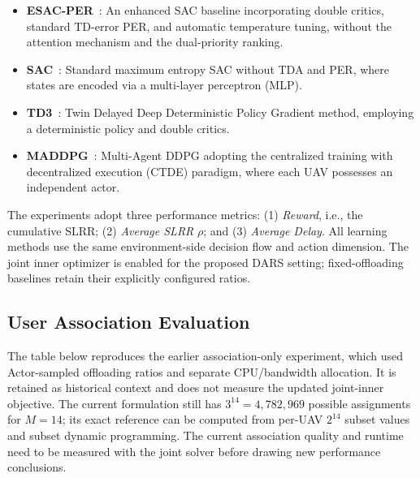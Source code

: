 \documentclass[journal]{IEEEtran}
\begin{document}
\begin{itemize}
\item \textbf{ESAC-PER}~\cite{nabi2025jour}: An enhanced SAC baseline incorporating double critics,
standard TD-error PER, and automatic temperature tuning, without the attention
mechanism and the dual-priority ranking.

\item \textbf{SAC}~\cite{haarnoja2018soft,chen2023sac_mec}: Standard maximum entropy SAC without TDA and PER, where states are encoded via a multi-layer perceptron (MLP).
\item \textbf{TD3}~\cite{fujimoto2018td3}: Twin Delayed Deep Deterministic Policy Gradient method, employing a deterministic policy and double critics.
\item \textbf{MADDPG}~\cite{lowe2017multi}: Multi-Agent DDPG adopting the centralized training with decentralized execution (CTDE) paradigm, where each UAV possesses an independent actor.
\end{itemize}

The experiments adopt three performance metrics: (1) \emph{Reward}, i.e., the
cumulative SLRR; (2) \emph{Average SLRR} $\rho$; and (3) \emph{Average Delay}.
All learning methods use the same environment-side decision flow and action
dimension. The joint inner optimizer is enabled for the proposed DARS setting;
fixed-offloading baselines retain their explicitly configured ratios.

\subsection{User Association Evaluation}
The table below reproduces the earlier association-only experiment, which used
Actor-sampled offloading ratios and separate CPU/bandwidth allocation. It is
retained as historical context and does not measure the updated joint-inner
objective. The current formulation still has $3^{14}=4{,}782{,}969$ possible
assignments for $M=14$; its exact reference can be computed from per-UAV
$2^{14}$ subset values and subset dynamic programming. The current association
quality and runtime need to be measured with the joint solver before drawing
new performance conclusions.
\end{document}
